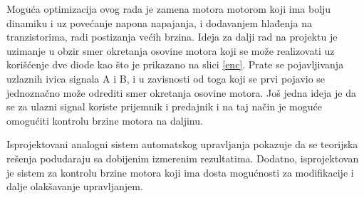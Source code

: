 \documentclass[a4paper, 12pt, diplomski]{etf}
\begin{document}
Moguća optimizacija ovog rada je zamena motora motorom koji ima bolju dinamiku i uz povećanje napona napajanja, i dodavanjem hlađenja na tranzistorima, radi postizanja većih brzina. Ideja za dalji rad na projektu je uzimanje u obzir smer okretanja osovine motora koji se može realizovati uz korišćenje dve diode kao što je prikazano na slici \ref{enc}. Prate se pojavljivanja uzlaznih ivica signala A i B, i u zavisnosti od toga koji se prvi pojavio se jednoznačno može odrediti smer okretanja osovine motora. Još jedna ideja je da se za ulazni signal koriste prijemnik i predajnik i na taj način je moguće omogućiti kontrolu brzine motora na daljinu.

Isprojektovani analogni sistem automatskog upravljanja pokazuje da se teorijska rešenja podudaraju sa dobijenim izmerenim rezultatima. Dodatno, isprojektovan je sistem za kontrolu brzine motora koji ima dosta mogućnosti za modifikacije i dalje olakšavanje upravljanjem.


\break 


\end{document}
